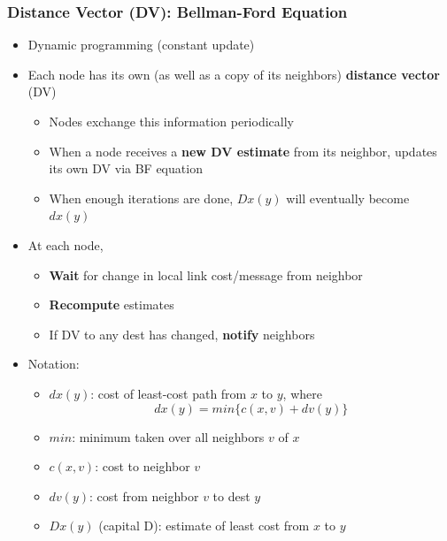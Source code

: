 \documentclass{article}
\begin{document}
\subsubsection{Distance Vector (DV): Bellman-Ford Equation}
\begin{itemize}
    \item Dynamic programming (constant update)
    \item Each node has its own (as well as a copy of its neighbors) \textbf{distance vector} (DV)
    \begin{itemize}
        \item Nodes exchange this information periodically
        \item When a node receives a \textbf{new DV estimate} from its neighbor, updates its own 
        DV via BF equation
        \item When enough iterations are done, $Dx(y)$ will eventually become $dx(y)$
    \end{itemize}
    \item At each node,
    \begin{itemize}
        \item \textbf{Wait} for change in local link cost/message from neighbor
        \item \textbf{Recompute} estimates
        \item If DV to any dest has changed, \textbf{notify} neighbors
    \end{itemize}
    \item Notation:
    \begin{itemize}
        \item $dx(y)$: cost of least-cost path from $x$ to $y$, where \[dx(y)=min\{c(x,v)+dv(y)\}\]
        \item $min$: minimum taken over all neighbors $v$ of $x$
        \item $c(x,v)$: cost to neighbor $v$\
        \item $dv(y)$: cost from neighbor $v$ to dest $y$
        \item $Dx(y)$ (capital D): estimate of least cost from $x$ to $y$
    \end{itemize}
\end{itemize}
\end{document}
